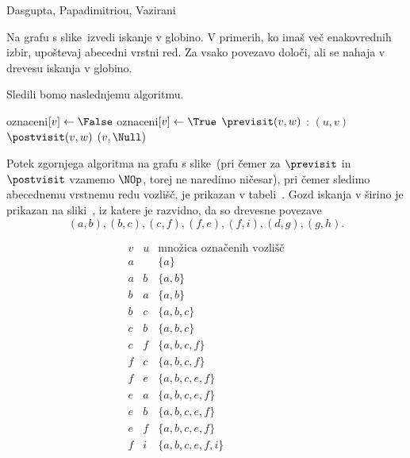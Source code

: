 \begin{naloga}%
{Dasgupta, Papadimitriou, Vazirani}{\cite[Exercise~3.1]{dpv}}
\begin{vprasanje}
Na grafu s slike~\fig[bfs] izvedi iskanje v globino.
V primerih, ko imaš več ena\-ko\-vred\-nih izbir,
upoštevaj abecedni vrstni red.
Za vsako povezavo določi, ali se nahaja v drevesu iskanja v globino.
\end{vprasanje}

\begin{odgovor}
Sledili bomo naslednjemu algoritmu.
\begin{small}
\begin{algorithmic}
		\State oznaceni$[v] \gets \False$
	\EndFor
            \State \Return
        \EndIf
        \State oznaceni$[v] \gets \True$
        \State $\previsit(v, w)$
		:
            $(u, v)$
		\EndFor
        \State $\postvisit(v, w)$
    \EndFunction
		$(v, \Null)$
	\EndFor
\EndFunction
\end{algorithmic}
\end{small}
%
Potek zgornjega algoritma na grafu s slike~\fig[bfs]
(pri čemer za $\previsit$ in $\postvisit$ vzamemo $\NOp$,
torej ne naredimo ničesar),
pri čemer sledimo abecednemu vrstnemu redu vozlišč,
je prikazan v tabeli~\tab.
Gozd iskanja v širino je prikazan na sliki~\fig,
iz katere je razvidno, da so drevesne povezave
$$
(a, b), (b, c), (c, f), (f, e), (f, i), (d, g), (g, h).
$$
\begin{tabela}
$$
\begin{array}{c|c|c}
v & u & \text{množica označenih vozlišč} \\ \hline
a &   & \{a\} \\
a &b & \{a, b\} \\
b & a &  \{a, b\} \\
b & c &  \{a, b, c\} \\
c & b & \{a, b, c\} \\
c & f & \{a, b, c, f\} \\
f & c & \{a, b, c, f\} \\
f & e & \{a, b, c, e, f\} \\
e & a & \{a, b, c, e, f\} \\
e & b & \{a, b, c, e, f\} \\
e & f & \{a, b, c, e, f\} \\
f & i & \{a, b, c, e, f, i\} \\

\end{array}$$
\end{tabela}
\end{odgovor}
\end{naloga}
